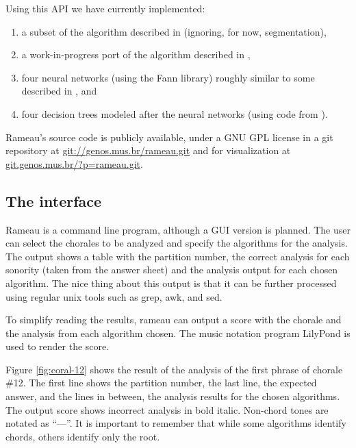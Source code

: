 \documentclass{article}
\begin{document}
Using this API we have currently implemented:

\begin{enumerate}
\item a subset of the algorithm described in \cite{pardo.ea:algorithms}
  (ignoring, for now, segmentation), 
\item a work-in-progress port of the algorithm described in
  \cite{temperley.ea:modeling}, 
\item four neural networks (using the Fann \cite{nissen:fann}
  library) roughly similar to some described in
  \cite{tsui:harmonic}, and
\item four decision trees modeled after the neural networks (using code
  from \cite{mitchell:machine}).
\end{enumerate}

Rameau's source code is publicly available, under a GNU GPL
\cite{fsf:gpl} license in a git \cite{baudis:git}
repository at \url{git://genos.mus.br/rameau.git} and for
visualization at \url{git.genos.mus.br/?p=rameau.git}.

\subsection{The interface}
\label{sec:analysis-output}

Rameau is a command line program, although a GUI version is planned.
The user can select the chorales to be analyzed and specify the
algorithms for the analysis. The output shows a table with the
partition number, the correct analysis for each sonority (taken from
the answer sheet) and the analysis output for each chosen algorithm.
The nice thing about this output is that it can be further processed
using regular unix tools such as grep, awk, and sed.

To simplify reading the results, rameau can output a score with the
chorale and the analysis from each algorithm chosen. The music
notation program LilyPond \cite{nienhuys.ea:lilypond} is used to
render the score.

Figure \ref{fig:coral-12} shows the result of the analysis of the
first phrase of chorale \#12. The first line shows the partition
number, the last line, the expected answer, and the lines in between,
the analysis results for the chosen algorithms. The output score shows
incorrect analysis in bold italic. Non-chord tones are notated as
``—''. It is important to remember that while some algorithms identify
chords, others identify only the root.
\end{document}
